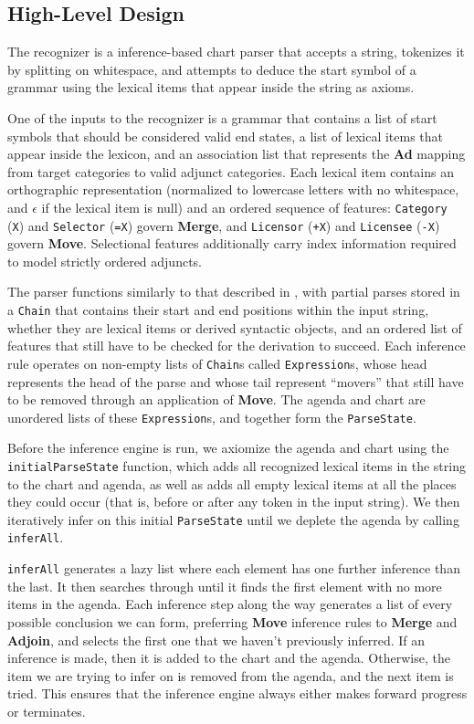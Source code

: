 \documentclass{article}
\begin{document}
\subsection{High-Level Design}
\label{sec:implementation-design}

The recognizer is a inference-based chart parser that accepts a string,
tokenizes it by splitting on whitespace, and attempts to deduce the
start symbol of a grammar using the lexical items that appear inside
the string as axioms.

One of the inputs to the recognizer is a grammar that contains a list
of start symbols that should be considered valid end states, a list of
lexical items that appear inside the lexicon, and an association list
that represents the \textbf{Ad} mapping from target categories to
valid adjunct categories. Each lexical item contains an orthographic
representation (normalized to lowercase letters with no whitespace,
and $\epsilon$ if the lexical item is null) and an ordered sequence of
features: \texttt{Category} (\texttt{X}) and \texttt{Selector}
(\texttt{=X}) govern \textbf{Merge}, and \texttt{Licensor}
(\texttt{+X}) and \texttt{Licensee} (\texttt{-X}) govern
\textbf{Move}.  Selectional features additionally carry index
information required to model strictly ordered adjuncts.

The parser functions similarly to that described in
\cite{stabler2001}, with partial parses stored in a \texttt{Chain}
that contains their start and end positions within the input string,
whether they are lexical items or derived syntactic objects, and an
ordered list of features that still have to be checked for the
derivation to succeed.  Each inference rule operates on non-empty
lists of \texttt{Chain}s called \texttt{Expression}s, whose head
represents the head of the parse and whose tail represent ``movers''
that still have to be removed through an application of
\textbf{Move}.  The agenda and chart are unordered lists of these
\texttt{Expression}s, and together form the \texttt{ParseState}.

Before the inference engine is run, we axiomize the agenda and chart
using the \texttt{initialParseState} function, which adds all
recognized lexical items in the string to the chart and agenda, as
well as adds all empty lexical items at all the places they could
occur (that is, before or after any token in the input string).  We
then iteratively infer on this initial \texttt{ParseState} until we
deplete the agenda by calling \texttt{inferAll}.

\texttt{inferAll} generates a lazy list where each element has one
further inference than the last.  It then searches through until it
finds the first element with no more items in the agenda.  Each
inference step along the way generates a list of every possible
conclusion we can form, preferring \textbf{Move} inference rules to
\textbf{Merge} and \textbf{Adjoin}, and selects the first one that we
haven't previously inferred.  If an inference is made, then it is
added to the chart and the agenda.  Otherwise, the item we are trying
to infer on is removed from the agenda, and the next item is tried.
This ensures that the inference engine always either makes forward
progress or terminates.
\end{document}

